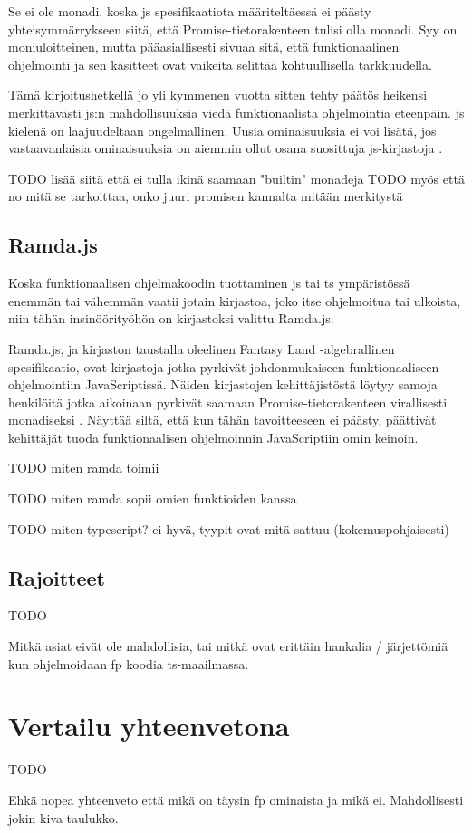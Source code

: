 Se ei ole monadi, koska \gls{js} spesifikaatiota määriteltäessä ei päästy yhteisymmärrykseen siitä, että Promise-tietorakenteen tulisi olla monadi. Syy on moniuloitteinen, mutta pääasiallisesti sivuaa sitä, että funktionaalinen ohjelmointi ja sen käsitteet ovat vaikeita selittää kohtuullisella tarkkuudella. \citep{promises-spec-94}

Tämä kirjoitushetkellä jo yli kymmenen vuotta sitten tehty päätös heikensi merkittävästi \gls{js}:n mahdollisuuksia viedä funktionaalista ohjelmointia eteenpäin. \Gls{js} kielenä on laajuudeltaan ongelmallinen. Uusia ominaisuuksia ei voi lisätä, jos vastaavanlaisia ominaisuuksia on aiemmin ollut osana suosittuja \gls{js}-kirjastoja \cite{proposal-joint-iteration,prototype_library_trends}.

TODO lisää siitä että ei tulla ikinä saamaan "builtin" monadeja
TODO myös että no mitä se tarkoittaa, onko juuri promisen kannalta mitään merkitystä

\subsection{Ramda.js}

Koska funktionaalisen ohjelmakoodin tuottaminen \gls{js} tai \gls{ts} ympäristössä enemmän tai vähemmän vaatii jotain kirjastoa, joko itse ohjelmoitua tai ulkoista, niin tähän insinöörityöhön on kirjastoksi valittu Ramda.js.

Ramda.js, ja kirjaston taustalla oleelinen Fantasy Land -algebrallinen spesifikaatio, ovat kirjastoja jotka pyrkivät johdonmukaiseen funktionaaliseen ohjelmointiin JavaScriptissä. Näiden kirjastojen kehittäjistöstä löytyy samoja henkilöitä jotka aikoinaan pyrkivät saamaan Promise-tietorakenteen virallisesti monadiseksi \cite{ramda:contributors,fantasy-land:contributors,promises-spec-94}. Näyttää siltä, että kun tähän tavoitteeseen ei päästy, päättivät kehittäjät tuoda funktionaalisen ohjelmoinnin JavaScriptiin omin keinoin.

TODO miten ramda toimii

TODO miten ramda sopii omien funktioiden kanssa

TODO miten typescript? ei hyvä, tyypit ovat mitä sattuu (kokemuspohjaisesti)

\subsection{Rajoitteet}

TODO

Mitkä asiat eivät ole mahdollisia, tai mitkä ovat erittäin hankalia / järjettömiä kun ohjelmoidaan fp koodia \gls{ts}-maailmassa.


\section{Vertailu yhteenvetona}

TODO

Ehkä nopea yhteenveto että mikä on täysin fp ominaista ja mikä ei. Mahdollisesti jokin kiva taulukko.